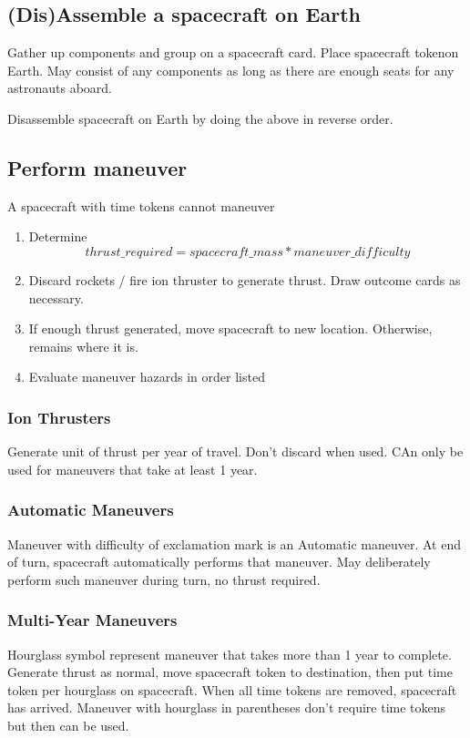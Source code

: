 \documentclass[12pt]{article}
\newenvironment{enumerateCustom}
{\begin{enumerate}
  \setlength{\itemsep}{1pt}
  \setlength{\parskip}{0pt}
  \setlength{\parsep}{0pt}}
{\end{enumerate}}
\begin{document}
\begin{multicols*}{2}
\subsection*{(Dis)Assemble a spacecraft on Earth}
Gather up components and group on a spacecraft card. Place spacecraft tokenon Earth. May consist of any components as long as there are enough seats for any astronauts aboard.

Disassemble spacecraft on Earth by doing the above in reverse order.

\subsection*{Perform maneuver}
A spacecraft with time tokens cannot maneuver
\begin{enumerateCustom}
    \item Determine \[thrust\_required = spacecraft\_mass * maneuver\_difficulty\]
    \item Discard rockets / fire ion thruster to generate thrust. Draw outcome cards as necessary.
    \item If enough thrust generated, move spacecraft to new location. Otherwise, remains where it is.
    \item Evaluate maneuver hazards in order listed
\end{enumerateCustom}

\subsubsection*{Ion Thrusters}
Generate unit of thrust per year of travel. Don't discard when used. CAn only be used for maneuvers that take at least 1 year.


\subsubsection*{Automatic Maneuvers}
Maneuver with difficulty of exclamation mark is an Automatic maneuver. At end of turn, spacecraft automatically performs that maneuver. May deliberately perform such maneuver during turn, no thrust required.

\subsubsection*{Multi-Year Maneuvers}
Hourglass symbol represent maneuver that takes more than 1 year to complete. Generate thrust as normal, move spacecraft token to destination, then put time token per hourglass on spacecraft. When all time tokens are removed, spacecraft has arrived. Maneuver with hourglass in parentheses don't require time tokens but then can be used.


\end{multicols*}
\end{document}
